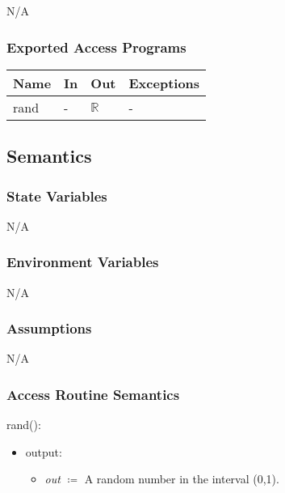 \documentclass[12pt, titlepage]{article}
\begin{document}
N/A

\subsubsection{Exported Access Programs}

\begin{center}
	\renewcommand*{\arraystretch}{1.5}
	\begin{tabular} {p{}  p{}  p{} 
			p{} } \hline 
		\textbf{Name} & \textbf{In} & \textbf{Out} & \textbf{Exceptions} \\ 
		\hline
		
		rand & - & $\mathbb{R}$ & - \\ \hline
	\end{tabular}
\end{center}

\subsection{Semantics}

\subsubsection{State Variables}

N/A

\subsubsection{Environment Variables}

N/A

\subsubsection{Assumptions}

N/A

\subsubsection{Access Routine Semantics}

rand():
\begin{itemize}
	\item output: 
	\begin{itemize}
		\item[] \textit{out} $\coloneqq$ A random number in the interval (0,1).
	\end{itemize}
\end{itemize}
\end{document}
